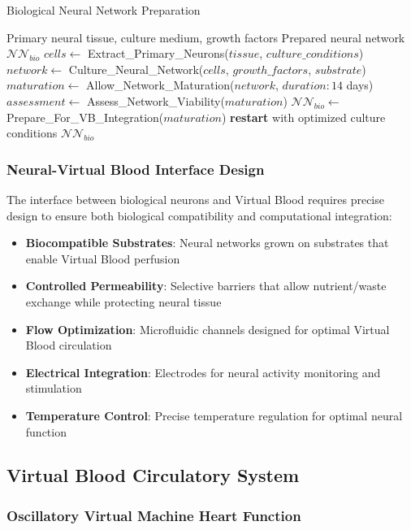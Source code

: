 \documentclass[12pt,a4paper]{article}
\begin{document}
\begin{algorithm}
\caption{Biological Neural Network Preparation}
\begin{algorithmic}[1]
\Require Primary neural tissue, culture medium, growth factors
\Ensure Prepared neural network $\mathcal{NN}_{bio}$
\State $cells \leftarrow$ Extract\_Primary\_Neurons($tissue$, $culture\_conditions$)
\State $network \leftarrow$ Culture\_Neural\_Network($cells$, $growth\_factors$, $substrate$)
\State $maturation \leftarrow$ Allow\_Network\_Maturation($network$, $duration: 14$ days)
\State $assessment \leftarrow$ Assess\_Network\_Viability($maturation$)
    \State $\mathcal{NN}_{bio} \leftarrow$ Prepare\_For\_VB\_Integration($maturation$)
\Else
    \State \textbf{restart} with optimized culture conditions
\EndIf
\State \Return $\mathcal{NN}_{bio}$
\end{algorithmic}
\end{algorithm}

\subsubsection{Neural-Virtual Blood Interface Design}

The interface between biological neurons and Virtual Blood requires precise design to ensure both biological compatibility and computational integration:

\begin{itemize}
\item \textbf{Biocompatible Substrates}: Neural networks grown on substrates that enable Virtual Blood perfusion
\item \textbf{Controlled Permeability}: Selective barriers that allow nutrient/waste exchange while protecting neural tissue
\item \textbf{Flow Optimization}: Microfluidic channels designed for optimal Virtual Blood circulation
\item \textbf{Electrical Integration}: Electrodes for neural activity monitoring and stimulation
\item \textbf{Temperature Control}: Precise temperature regulation for optimal neural function
\end{itemize}

\subsection{Virtual Blood Circulatory System}

\subsubsection{Oscillatory Virtual Machine Heart Function}
\end{document}
